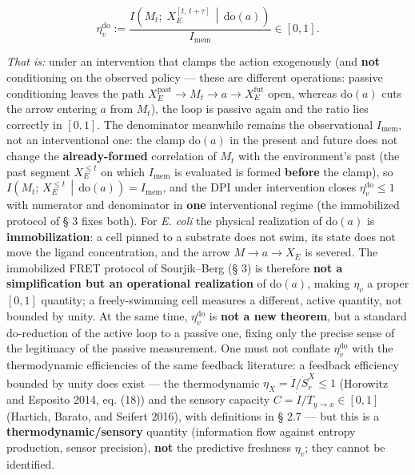 \documentclass[pdflatex,sn-mathphys-ay]{sn-jnl}
\begin{document}
\begin{equation}\eta_v^{\mathrm{do}} := \frac{I\!\left(M_t;\; X_E^{[t,\,t+\tau]} \,\middle|\, \mathrm{do}(a)\right)}{I_{\text{mem}}}
  \in [0, 1]. \tag{1b}\end{equation}

\emph{That is:} under an intervention that clamps the action exogenously (and \textbf{not} conditioning on the observed policy --- these are different operations: passive conditioning leaves the path \(X_E^{\text{past}} \to M_t \to a \to X_E^{\text{fut}}\) open, whereas \(\mathrm{do}(a)\) cuts the arrow entering \(a\) from \(M_t\)), the loop is passive again and the ratio lies correctly in \([0, 1]\). The denominator meanwhile remains the observational \(I_{\text{mem}}\), not an interventional one: the clamp \(\mathrm{do}(a)\) in the present and future does not change the \textbf{already-formed} correlation of \(M_t\) with the environment's past (the past segment \(X_E^{\le t}\) on which \(I_{\text{mem}}\) is evaluated is formed \textbf{before} the clamp), so \(I\!\left(M_t;\, X_E^{\le t}\,\middle|\,\mathrm{do}(a)\right) = I_{\text{mem}}\), and the DPI under intervention closes \(\eta_v^{\mathrm{do}} \le 1\) with numerator and denominator in \textbf{one} interventional regime (the immobilized protocol of § 3 fixes both). For \emph{E. coli} the physical realization of \(\mathrm{do}(a)\) is \textbf{immobilization}: a cell pinned to a substrate does not swim, its state does not move the ligand concentration, and the arrow \(M \to a \to X_E\) is severed. The immobilized FRET protocol of Sourjik--Berg (§ 3) is therefore \textbf{not a simplification but an operational realization} of \(\mathrm{do}(a)\), making \(\eta_v\) a proper \([0, 1]\) quantity; a freely-swimming cell measures a different, active quantity, not bounded by unity. At the same time, \(\eta_v^{\mathrm{do}}\) is \textbf{not a new theorem}, but a standard do-reduction of the active loop to a passive one, fixing only the precise sense of the legitimacy of the passive measurement. One must not conflate \(\eta_v^{\mathrm{do}}\) with the thermodynamic efficiencies of the same feedback literature: a feedback efficiency bounded by unity does exist --- the thermodynamic \(\eta_X = \dot I/\dot S_r^X \le 1\) (Horowitz and Esposito 2014, eq. (18)) and the sensory capacity \(C = \dot I/T_{y\to x} \in [0, 1]\) (Hartich, Barato, and Seifert 2016), with definitions in § 2.7 --- but this is a \textbf{thermodynamic/sensory} quantity (information flow against entropy production, sensor precision), \textbf{not} the predictive freshness \(\eta_v\); they cannot be identified.
\end{document}
